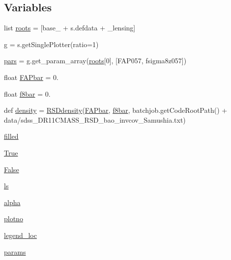 \subsection*{Variables}
\begin{DoxyCompactItemize}
\item 
list \mbox{\hyperlink{namespaceFAP__fsigma8_af204b7b3e8a493db4b072ef5dc2ac85f}{roots}} = \mbox{[}\textquotesingle{}base\+\_\+\textquotesingle{} + s.\+defdata + \textquotesingle{}\+\_\+lensing\textquotesingle{}\mbox{]}
\item 
\mbox{\hyperlink{namespaceFAP__fsigma8_a861852844c400716765fad7e9908c80f}{g}} = s.\+get\+Single\+Plotter(ratio=1)
\item 
\mbox{\hyperlink{namespaceFAP__fsigma8_a1a280d96614f72665ca18c542ba10cb6}{pars}} = g.\+get\+\_\+param\+\_\+array(\mbox{\hyperlink{namespaceFAP__fsigma8_af204b7b3e8a493db4b072ef5dc2ac85f}{roots}}\mbox{[}0\mbox{]}, \mbox{[}\textquotesingle{}F\+A\+P057\textquotesingle{}, \textquotesingle{}fsigma8z057\textquotesingle{}\mbox{]})
\item 
float \mbox{\hyperlink{namespaceFAP__fsigma8_a21f75188f94e2d15b133164b044318dd}{F\+A\+Pbar}} = 0.
\item 
float \mbox{\hyperlink{namespaceFAP__fsigma8_aa11ac818be82b0a372ec359695ca6fd8}{f8bar}} = 0.
\item 
def \mbox{\hyperlink{namespaceFAP__fsigma8_a83cb5d8eaffbd53728890e5d7f6bc10f}{density}} = \mbox{\hyperlink{namespaceFAP__fsigma8_a80cad49915e715358d6cf2af830fb271}{R\+S\+Ddensity}}(\mbox{\hyperlink{namespaceFAP__fsigma8_a21f75188f94e2d15b133164b044318dd}{F\+A\+Pbar}}, \mbox{\hyperlink{namespaceFAP__fsigma8_aa11ac818be82b0a372ec359695ca6fd8}{f8bar}}, batchjob.\+get\+Code\+Root\+Path() + \textquotesingle{}data/sdss\+\_\+\+D\+R11\+C\+M\+A\+S\+S\+\_\+\+R\+S\+D\+\_\+bao\+\_\+invcov\+\_\+\+Samushia.\+txt\textquotesingle{})
\item 
\mbox{\hyperlink{namespaceFAP__fsigma8_a925fdc1f07a5d9673fdc271033c96deb}{filled}}
\item 
\mbox{\hyperlink{namespaceFAP__fsigma8_a35b032e6fe93daaaf189ff187e64080f}{True}}
\item 
\mbox{\hyperlink{namespaceFAP__fsigma8_a7b1192e2aaf3af47378bbc4527f86a1c}{False}}
\item 
\mbox{\hyperlink{namespaceFAP__fsigma8_ae54183040b66feb83a52b37b5482c66a}{ls}}
\item 
\mbox{\hyperlink{namespaceFAP__fsigma8_a4f7e69d33f52bc12ca25a32dda3285c2}{alpha}}
\item 
\mbox{\hyperlink{namespaceFAP__fsigma8_acd7126bc97d67e02761422e6ef482940}{plotno}}
\item 
\mbox{\hyperlink{namespaceFAP__fsigma8_ac0f55eaa46cb51f870ef1f61c73c0338}{legend\+\_\+loc}}
\item 
\mbox{\hyperlink{namespaceFAP__fsigma8_ab370fd341f1723df09804c025876662d}{params}}
\end{DoxyCompactItemize}


